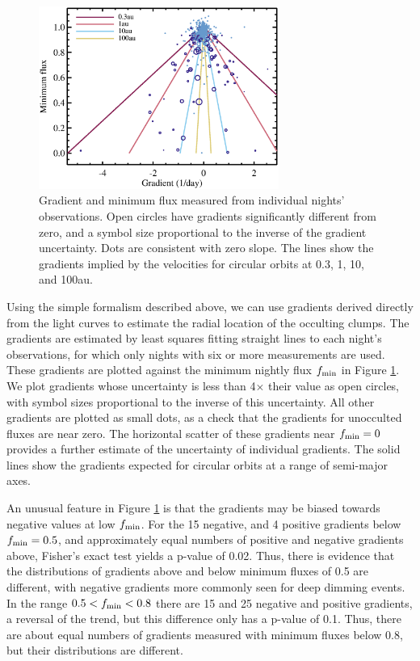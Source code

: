 \documentclass[]{rsos}
\begin{document}
\begin{figure}
  \begin{center}
    \hspace{-0.5cm} \includegraphics[width=0.7\textwidth]{figs/gradients.eps}
    \caption{Gradient and minimum flux measured from individual nights'
      observations. Open circles have gradients significantly different from zero, and a
      symbol size proportional to the inverse of the gradient uncertainty. Dots are
      consistent with zero slope. The lines show the gradients implied by the velocities
      for circular orbits at 0.3, 1, 10, and 100au.}\label{fig:grad}
  \end{center}
\end{figure}

Using the simple formalism described above, we can use gradients derived directly from
the light curves to estimate the radial location of the occulting clumps. The gradients
are estimated by least squares fitting straight lines to each night's observations, for
which only nights with six or more measurements are used. These gradients are plotted
against the minimum nightly flux $f_{\rm min}$ in Figure \ref{fig:grad}. We plot
gradients whose uncertainty is less than 4$\times$ their value as open circles, with
symbol sizes proportional to the inverse of this uncertainty. All other gradients are
plotted as small dots, as a check that the gradients for unocculted fluxes are near
zero. The horizontal scatter of these gradients near $f_{\rm min}=0$ provides a further
estimate of the uncertainty of individual gradients. The solid lines show the gradients
expected for circular orbits at a range of semi-major axes.

An unusual feature in Figure \ref{fig:grad} is that the gradients may be biased towards
negative values at low $f_{\rm min}$. For the 15 negative, and 4 positive gradients below
$f_{\rm min}=0.5$, and approximately equal numbers of positive and negative gradients
above, Fisher's exact test yields a p-value of 0.02. Thus, there is evidence that the
distributions of gradients above and below minimum fluxes of 0.5 are different, with
negative gradients more commonly seen for deep dimming events. In the range
$0.5<f_{\rm min}<0.8$ there are 15 and 25 negative and positive gradients, a reversal of
the trend, but this difference only has a p-value of 0.1. Thus, there are about equal
numbers of gradients measured with minimum fluxes below 0.8, but their distributions are
different.
\end{document}
